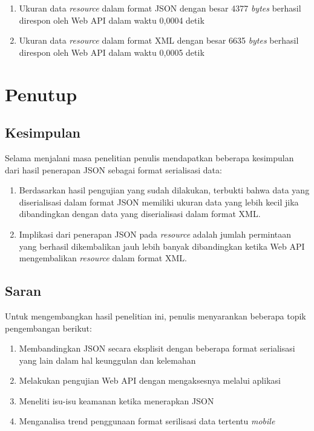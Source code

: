 \documentclass{llncs}
\begin{document}
\begin{enumerate}
  \item Ukuran data \textit{resource} dalam format JSON dengan besar 4377 \textit{bytes} berhasil direspon oleh Web API dalam waktu 0,0004 detik
  \item Ukuran data \textit{resource} dalam format XML dengan besar 6635 \textit{bytes} berhasil direspon oleh Web API dalam waktu 0,0005 detik
\end{enumerate}

\section{Penutup}

\subsection{Kesimpulan}

Selama menjalani masa penelitian penulis mendapatkan beberapa kesimpulan dari hasil penerapan JSON sebagai format serialisasi data:

\begin{enumerate}
  \item Berdasarkan hasil pengujian yang sudah dilakukan, terbukti bahwa data yang diserialisasi dalam format JSON memiliki ukuran data yang lebih kecil jika dibandingkan dengan data yang diserialisasi dalam format XML.
  \item Implikasi dari penerapan JSON pada \textit{resource} adalah jumlah permintaan yang berhasil dikembalikan jauh lebih banyak dibandingkan ketika Web API mengembalikan \textit{resource} dalam format XML.
\end{enumerate}

\subsection{Saran}

Untuk mengembangkan hasil penelitian ini, penulis menyarankan beberapa topik pengembangan berikut:

\begin{enumerate}
  \item Membandingkan JSON secara eksplisit dengan beberapa format serialisasi yang lain dalam hal keunggulan dan kelemahan
  \item Melakukan pengujian Web API dengan mengaksesnya melalui aplikasi
  \item Meneliti isu-isu keamanan ketika menerapkan JSON
  \item Menganalisa trend penggunaan format serilisasi data tertentu  
  \textit{mobile}
\end{enumerate}
\end{document}
